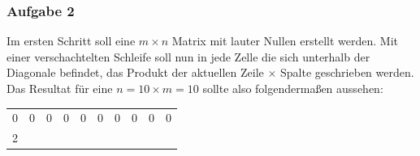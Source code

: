 \documentclass[]{article}
\begin{document}
\subsubsection*{Aufgabe 2}\label{aufgabe-2-1}

Im ersten Schritt soll eine \(m \times n\) Matrix mit lauter Nullen
erstellt werden. Mit einer verschachtelten Schleife soll nun in jede
Zelle die sich unterhalb der Diagonale befindet, das Produkt der
aktuellen Zeile \(\times\) Spalte geschrieben werden. Das Resultat für
eine \(n = 10 \times m = 10\) sollte also folgendermaßen aussehen:

\begin{longtable}[]{@{}cccccccccc@{}}
\toprule
\begin{minipage}[t]{0.05\columnwidth}\centering\strut
0\strut
\end{minipage} & \begin{minipage}[t]{0.05\columnwidth}\centering\strut
0\strut
\end{minipage} & \begin{minipage}[t]{0.05\columnwidth}\centering\strut
0\strut
\end{minipage} & \begin{minipage}[t]{0.05\columnwidth}\centering\strut
0\strut
\end{minipage} & \begin{minipage}[t]{0.05\columnwidth}\centering\strut
0\strut
\end{minipage} & \begin{minipage}[t]{0.05\columnwidth}\centering\strut
0\strut
\end{minipage} & \begin{minipage}[t]{0.05\columnwidth}\centering\strut
0\strut
\end{minipage} & \begin{minipage}[t]{0.05\columnwidth}\centering\strut
0\strut
\end{minipage} & \begin{minipage}[t]{0.05\columnwidth}\centering\strut
0\strut
\end{minipage} & \begin{minipage}[t]{0.05\columnwidth}\centering\strut
0\strut
\end{minipage}\tabularnewline
\begin{minipage}[t]{0.05\columnwidth}\centering\strut
2\strut
\end{minipage} & \begin{minipage}[t]{0.05\columnwidth}\centering\strut

\end{minipage}
\end{longtable}
\end{document}
